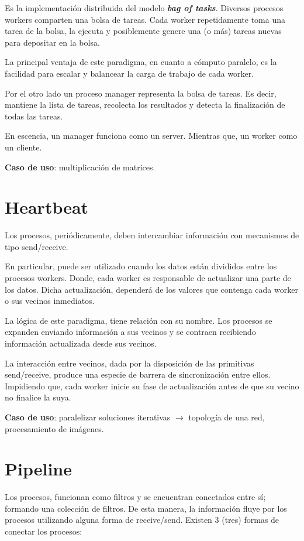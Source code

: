 \documentclass[a4paper, 10pt]{report}
\begin{document}
Es la implementación distribuida del modelo \textbf{\emph{bag of tasks}}. Diversos procesos workers comparten una bolsa de tareas. Cada worker repetidamente toma una tarea de la bolsa, la ejecuta y posiblemente genere una (o más) tareas nuevas para depositar en la bolsa.

La principal ventaja de este paradigma, en cuanto a cómputo paralelo, es la facilidad para escalar y balancear la carga de trabajo de cada worker.

Por el otro lado un proceso manager representa la bolsa de tareas. Es decir, mantiene la lista de tareas, recolecta los resultados y detecta la finalización de todas las tareas.

En escencia, un manager funciona como un server. Mientras que, un worker como un cliente.

\textbf{Caso de uso}: multiplicación de matrices.

\section{Heartbeat}

Los procesos, periódicamente, deben intercambiar información con mecanismos de tipo send/receive.

En particular, puede ser utilizado cuando los datos están divididos entre los procesos workers. Donde, cada worker es responsable de actualizar una parte de los datos. Dicha actualización, dependerá de los valores que contenga cada worker o sus vecinos inmediatos.

La lógica de este paradigma, tiene relación con su nombre. Los procesos se expanden enviando información a sus vecinos y se contraen recibiendo información actualizada desde sus vecinos.

La interacción entre vecinos, dada por la disposición de las primitivas send/receive, produce una especie de barrera de sincronización entre ellos. Impidiendo que, cada worker inicie su fase de actualización antes de que su vecino no finalice la suya.

\textbf{Caso de uso}: paralelizar soluciones iterativas $\rightarrow$ topología de una red, procesamiento de imágenes.

\section{Pipeline}

Los procesos, funcionan como filtros y se encuentran conectados entre sí; formando una colección de filtros. De esta manera, la información fluye por los procesos utilizando alguna forma de receive/send. Existen 3 (tres) formas de conectar los procesos:
\end{document}
